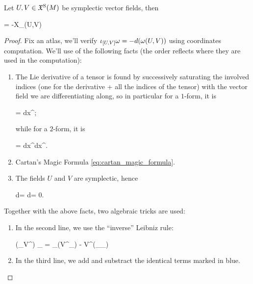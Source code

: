 \documentclass[main.tex]{subfiles}
\begin{document}
\begin{theorem}
\label{th:comm_is_ham}
	Let $U, V \in \mathfrak{X}^{\mathrm{S}}(M)$ be symplectic vector fields, then
	\begin{eqalign}
		[U, V] = -X_{\omega(U,V)}
	\end{eqalign}
\end{theorem}
\begin{proof}
	Fix an atlas, we'll verify $\iota_{[U,V]} \omega = -d(\omega(U,V))$ using coordinates computation. We'll use of the following facts (the order reflects where they are used in the computation):
	\begin{enumerate}
		\item The Lie derivative of a tensor is found by successively saturating the involved indices (one for the derivative + all the indices of the tensor) with the vector field we are differentiating along, so in particular for a $1$-form, it is
		\begin{eqalign}
			 \eta =  dx^\beta;
		\end{eqalign}
		while for a $2$-form, it is
		\begin{eqalign}
			 \omega =  dx^\alpha \wedge dx^\beta.
		\end{eqalign}
		\item Cartan's Magic Formula \eqref{eq:cartan_magic_formula}.
		\item The fields $U$ and $V$ are symplectic, hence
		\begin{eqalign}
			d\omega = d\omega = 0.
		\end{eqalign}
	\end{enumerate}

	Together with the above facts, two algebraic tricks are used:

	\begin{enumerate}
		\item In the second line, we use the ``inverse'' Leibniz rule:
		\begin{eqalign}
			(\partial_\mu V^\alpha) \omega_{\alpha\beta} = \partial_\mu (V^\alpha \omega_\alpha \beta) - V^\alpha (\partial_\mu \omega_{\alpha\beta})
		\end{eqalign}
		\item In the third line, we add and substract the identical terms marked in blue.
	\end{enumerate}


\end{proof}
\end{document}
